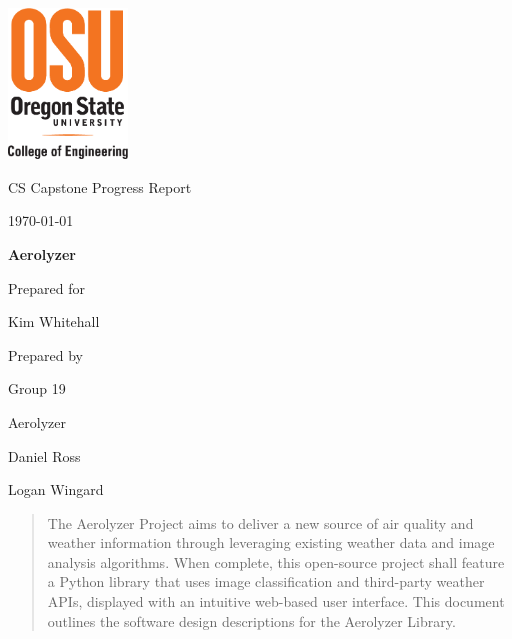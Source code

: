 \documentclass[onecolumn, draftclsnofoot,10pt, compsoc]{IEEEtran}
\def \CapstoneTeamName{		Aerolyzer}
\def \CapstoneTeamNumber{		19}
\def \GroupMemberOne{			Daniel Ross}
\def \GroupMemberTwo{			Logan Wingard}
\def \CapstoneProjectName{		Aerolyzer}
\def \CapstoneSponsorPerson{		Kim Whitehall}
\def \DocType{		%
	Progress Report
}
\newcommand{\NameSigPair}[1]{\par
	\makebox[2.75in][r]{#1} \hfil 	\makebox[3.25in]{\makebox[2.25in]{\hrulefill} \hfill		\makebox[.75in]{\hrulefill}}
	\par\vspace{-12pt} \textit{\tiny\noindent
		\makebox[2.75in]{} \hfil		\makebox[3.25in]{\makebox[2.25in][r]{Signature} \hfill	\makebox[.75in][r]{Date}}}}
\renewcommand{\NameSigPair}[1]{#1}
\begin{document}
	\begin{titlepage}
		\begin{singlespace}
			\centering
			\includegraphics[height=4cm,natwidth=345,natheight=435]{images/coe_v_spot1.png}
			\hfill 
			\par\vspace{.2in}
			\centering
			\scshape{
				\huge CS Capstone \DocType \par
				{\large\today}\par
				\vspace{.5in}
				\textbf{\Huge\CapstoneProjectName}\par
				\vfill
				{\large Prepared for}\par
				{\Large\NameSigPair{\CapstoneSponsorPerson}\par}
				{\large Prepared by }\par
				Group\CapstoneTeamNumber\par
				\CapstoneTeamName\par 
				\vspace{5pt}
				{\large
					\NameSigPair{\GroupMemberOne}\par
					\NameSigPair{\GroupMemberTwo}\par
				}
				\vspace{20pt}
			}
			\begin{abstract}  
				The Aerolyzer Project aims to deliver a new source of air quality and weather information through leveraging existing weather data and image analysis algorithms.
				When complete, this open-source project shall feature a Python library that uses image classification and third-party weather APIs, displayed with an intuitive web-based user interface.
				This document outlines the software design descriptions for the Aerolyzer Library. 
			\end{abstract}     
		\end{singlespace}
	\end{titlepage}
\end{document}
